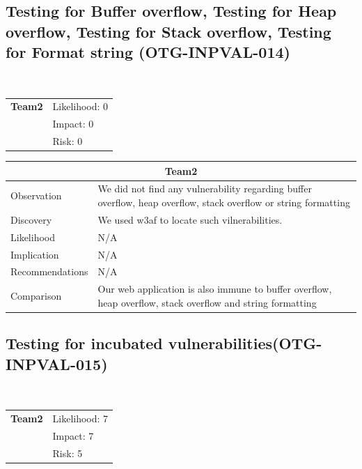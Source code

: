 \documentclass[headsepline,footsepline,footinclude=false,oneside,fontsize=11pt,paper=a4,listof=totoc,bibliography=totoc]{scrbook} %
\begin{document}
\subsection{Testing for Buffer overflow, Testing for Heap overflow, Testing for Stack overflow, Testing for Format string (OTG-INPVAL-014)}\

\begin{tabular}{cR{12cm}}
	\textbf{Team2} & Likelihood: 0\\& Impact: 0\\& Risk: 0
\end{tabular}

\begin{tabular}{ l|p{11cm}  }
	\hline
	\multicolumn{2}{c}{\textbf{Team2}} \\
	\hline
	Observation   & We did not find any vulnerability regarding buffer overflow,
	heap overflow, stack overflow or string formatting\\
	Discovery  & We used w3af to locate such vilnerabilities. \\
	Likelihood & N/A \\
	Implication    & N/A \\
	Recommendations & N/A \\
	Comparison& Our web application is also immune to buffer overflow,
	heap overflow, stack overflow and string formatting \\
	\hline
\end{tabular}

\pagebreak
\subsection{Testing for incubated vulnerabilities(OTG-INPVAL-015)}\

\begin{tabular}{cR{12cm}}
	\textbf{Team2} & Likelihood: 7\\& Impact: 7\\& Risk: 5
\end{tabular}
\end{document}
